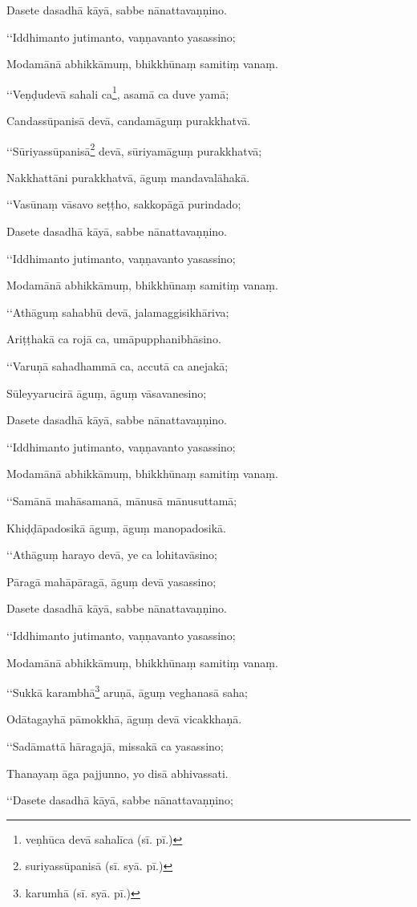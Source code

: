 Dasete dasadhā kāyā, sabbe nānattavaṇṇino.

‘‘Iddhimanto jutimanto, vaṇṇavanto yasassino;

Modamānā abhikkāmuṃ, bhikkhūnaṃ samitiṃ vanaṃ.

‘‘Veṇḍudevā sahali ca\footnote{veṇhūca devā sahalīca (sī. pī.)}, asamā ca duve yamā;

Candassūpanisā devā, candamāguṃ purakkhatvā.

‘‘Sūriyassūpanisā\footnote{suriyassūpanisā (sī. syā. pī.)} devā, sūriyamāguṃ purakkhatvā;

Nakkhattāni purakkhatvā, āguṃ mandavalāhakā.

‘‘Vasūnaṃ vāsavo seṭṭho, sakkopāgā purindado;

Dasete dasadhā kāyā, sabbe nānattavaṇṇino.

‘‘Iddhimanto jutimanto, vaṇṇavanto yasassino;

Modamānā abhikkāmuṃ, bhikkhūnaṃ samitiṃ vanaṃ.

‘‘Athāguṃ sahabhū devā, jalamaggisikhāriva;

Ariṭṭhakā ca rojā ca, umāpupphanibhāsino.

‘‘Varuṇā sahadhammā ca, accutā ca anejakā;

Sūleyyarucirā āguṃ, āguṃ vāsavanesino;

Dasete dasadhā kāyā, sabbe nānattavaṇṇino.

‘‘Iddhimanto jutimanto, vaṇṇavanto yasassino;

Modamānā abhikkāmuṃ, bhikkhūnaṃ samitiṃ vanaṃ.

‘‘Samānā mahāsamanā, mānusā mānusuttamā;

Khiḍḍāpadosikā āguṃ, āguṃ manopadosikā.

‘‘Athāguṃ harayo devā, ye ca lohitavāsino;

Pāragā mahāpāragā, āguṃ devā yasassino;

Dasete dasadhā kāyā, sabbe nānattavaṇṇino.

‘‘Iddhimanto jutimanto, vaṇṇavanto yasassino;

Modamānā abhikkāmuṃ, bhikkhūnaṃ samitiṃ vanaṃ.

‘‘Sukkā karambhā\footnote{karumhā (sī. syā. pī.)} aruṇā, āguṃ veghanasā saha;

Odātagayhā pāmokkhā, āguṃ devā vicakkhaṇā.

‘‘Sadāmattā hāragajā, missakā ca yasassino;

Thanayaṃ āga pajjunno, yo disā abhivassati.

‘‘Dasete dasadhā kāyā, sabbe nānattavaṇṇino;

